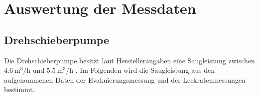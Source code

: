 \section{Auswertung der Messdaten}
\label{sec:Auswertung}
\subsection{Drehschieberpumpe}
Die Drehschieberpumpe besitzt laut Herstellerangaben eine Saugleistung zwischen 
$\SI{4.6}{\cubic\metre\per\hour}$ und $\SI{5.5}{\cubic\metre\per\hour}$ \cite{Versuchsbeschreibung}.
Im Folgenden wird die Saugleistung aus den aufgenommenen Daten der Evakuierungsmessung
und der Leckratenmessungen bestimmt. 
